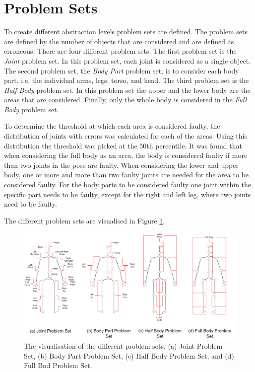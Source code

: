 \section{Problem Sets}
\label{sec:problem_set}

To create different abstraction levels problem sets are defined. The problem sets are defined by the number of objects that are considered and are defined as erroneous. There are four different problem sets. The first problem set is the \textit{Joint} problem set. In this problem set, each joint is considered as a single object. The second problem set, the \textit{Body Part} problem set, is to consider each body part, i.e. the individual arms, legs, torso, and head. The third problem set is the \textit{Half Body} problem set. In this problem set the upper and the lower body are the areas that are considered. Finally, only the whole body is considered in the \textit{Full Body} problem set.

To determine the threshold at which each area is considered faulty, the distribution of joints with errors was calculated for each of the areas. Using this distribution the threshold was picked at the 50th percentile. It was found that when considering the full body as an area, the body is considered faulty if more than two joints in the pose are faulty. When considering the lower and upper body, one or more and more than two faulty joints are needed for the area to be considered faulty. For the body parts to be considered faulty one joint within the specific part needs to be faulty, except for the right and left leg, where two joints need to be faulty.

The different problem sets are visualised in Figure \ref{fig:ps}.

\begin{figure}[ht]
  \centering
  \includegraphics[width=\textwidth]{figures/HPE/problem_sets.png}
  \caption[Visualisation of the Problemsets]{The visualisation of the different problem sets, (a) Joint Problem Set, (b) Body Part Problem Set, (c) Half Body Problem Set, and (d) Full Bod Problem Set.}
  \label{fig:ps}
\end{figure}
